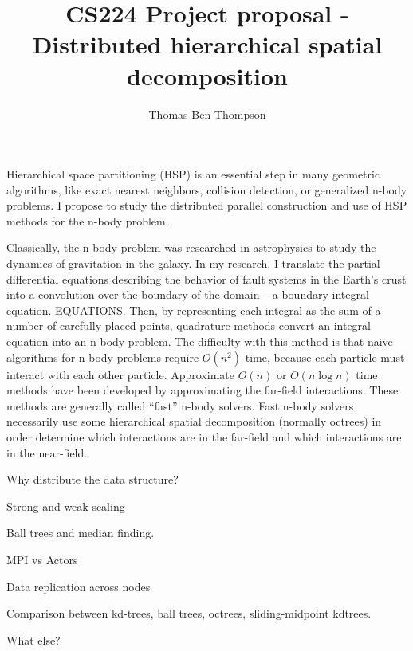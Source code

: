 \documentclass[a4paper]{article}
\author{Thomas Ben Thompson}
\title{CS224 Project proposal - Distributed hierarchical spatial decomposition}
\begin{document}
\maketitle

Hierarchical space partitioning (HSP) is an essential step in many geometric algorithms, like exact nearest neighbors, collision detection, or generalized n-body problems. I propose to study the distributed parallel construction and use of HSP methods for the n-body problem.

Classically, the n-body problem was researched in astrophysics to study the dynamics of gravitation in the galaxy. In my research, I translate the partial differential equations describing the behavior of fault systems in the Earth's crust into a convolution over the boundary of the domain -- a boundary integral equation. EQUATIONS. Then, by representing each integral as the sum of a number of carefully placed points, quadrature methods convert an integral equation into an n-body problem. The difficulty with this method is that naive algorithms for n-body problems require $O(n^2)$ time, because each particle must interact with each other particle. Approximate $O(n)$ or $O(n\log{n})$ time methods have been developed by approximating the far-field interactions. These methods are generally called ``fast'' n-body solvers. Fast n-body solvers necessarily use some hierarchical spatial decomposition (normally octrees) in order determine which interactions are in the far-field and which interactions are in the near-field. 

Why distribute the data structure?

Strong and weak scaling

Ball trees and median finding. 

MPI vs Actors

Data replication across nodes

Comparison between kd-trees, ball trees, octrees, sliding-midpoint kdtrees.

What else?
\end{document}
